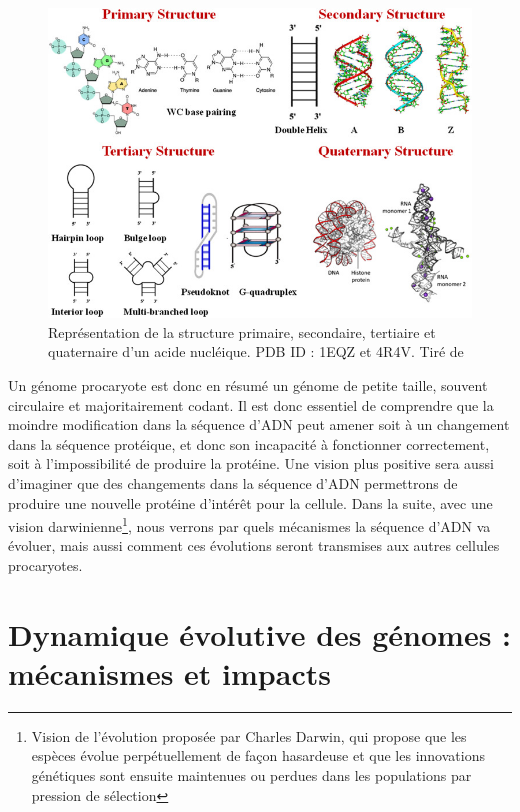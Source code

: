 \begin{figure}[htbp]
    \centering
    \includegraphics[width=0.8\linewidth]{images/structureDNA.jpg}
    \caption[Structure de l'ADN]{Représentation de la structure primaire, secondaire, tertiaire et quaternaire d'un acide nucléique. PDB ID : 1EQZ et 4R4V. Tiré de \cite{kumar_biomolecular_2019}}
    \label{fig:structure_dna}
\end{figure}

Un génome procaryote est donc en résumé un génome de petite taille, souvent circulaire et majoritairement codant. Il est donc essentiel de comprendre que la moindre modification dans la séquence d'ADN peut amener soit à un changement dans la séquence protéique, et donc son incapacité à fonctionner correctement, soit à l'impossibilité de produire la protéine. Une vision plus positive sera aussi d'imaginer que des changements dans la séquence d'ADN permettrons de produire une nouvelle protéine d'intérêt pour la cellule. Dans la suite, avec une vision darwinienne\footnote{Vision de l'évolution proposée par Charles Darwin, qui propose que les espèces évolue perpétuellement de façon hasardeuse et que les innovations génétiques sont ensuite maintenues ou perdues dans les populations par pression de sélection}, nous verrons par quels mécanismes la séquence d'ADN va évoluer, mais aussi comment ces évolutions seront transmises aux autres cellules procaryotes. 

\section{Dynamique évolutive des génomes : mécanismes et impacts}
\label{sec:dyn_evo}

